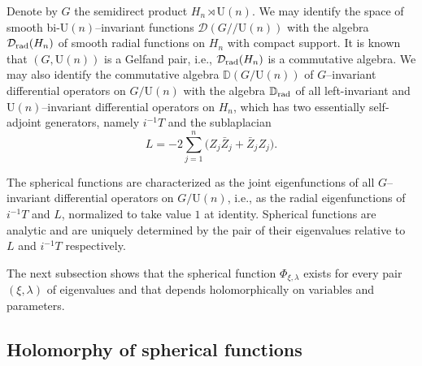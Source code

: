 \documentclass[12pt,a4paper]{amsart}
\theoremstyle{plain}
\theoremstyle{definition}
\numberwithin{equation}{section}
\begin{document}
  Denote by $G$ the   semidirect product ${{H_{n}}}\rtimes {{\text{U}({n})}}$.
    We may identify the space of smooth bi-${{\text{U}({n})}}$--invariant functions  ${\mathcal D}(G/\!/{{\text{U}({n})}})$ 
with the   algebra  ${{\mathcal D}_{\text{\rm rad}}}({{H_{n}}})$ 
of smooth radial  functions on ${{H_{n}}}$ with compact support. It is known~\cite{HR,DR} that 
$(G,{{\text{U}({n})}})$ is a Gelfand pair, i.e.,
${{\mathcal D}_{\text{\rm rad}}}({{H_{n}}})$  is a commutative algebra.  
We may also identify the commutative 
algebra $\mathbb D(G/{{\text{U}({n})}})$ of $G$--invariant differential operators on 
$G/{{\text{U}({n})}}$   with the algebra
${{\mathbb D}_{\text{\rm rad}}}$ of all left-invariant and
${{\text{U}({n})}}$--invariant differential operators on ${{H_{n}}}$, which    has
two essentially self-adjoint 
generators, namely $i^{-1}T$
and the 
  sublaplacian
$$
L=-2\sum_{j=1}^{n}\bigl( Z_j\bar Z_j+\bar Z_j Z_j\bigr) .
$$

The   spherical 
functions are characterized as the  
joint eigenfunctions
of all 
$G$--invariant differential operators on 
$G/{{\text{U}({n})}}$, i.e., as the radial eigenfunctions of $i^{-1}T$
and $L$,  normalized to take value $1$ at identity.
Spherical functions are analytic and are uniquely determined by the pair  of their eigenvalues relative to 
$L$ and $i^{-1}T$ respectively. 

The next subsection  shows that the spherical function 
$\Phi_{\xi,{\lambda}}$ exists for every pair $(\xi,{\lambda})$ of 
eigenvalues  and that  depends  holomorphically
on variables and parameters.

\subsection{Holomorphy of spherical functions}
\end{document}
